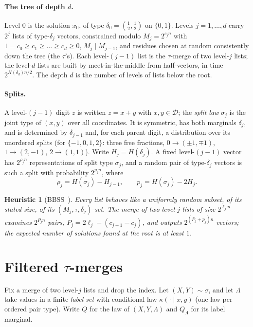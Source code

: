 \documentclass[11pt]{article}
\newtheorem{heuristic}{Heuristic}
\theoremstyle{definition}
\theoremstyle{remark}
\newcommand{\cD}{\mathcal{D}}
\begin{document}
\paragraph{The tree of depth $d$.} Level $0$ is the solution $x_0$, of type $\delta_0=(\tfrac12,\tfrac12)$ on $\{0,1\}$.
Levels $j=1,\dots,d$ carry $2^j$ lists of type-$\delta_j$ vectors, constrained modulo $M_j=2^{c_jn}$ with
$1=c_0\ge c_1\ge\dots\ge c_d\ge0$, $M_j\mid M_{j-1}$, and residues chosen at random consistently down the tree (the
$\tau$'s). Each level-$(j-1)$ list is the $\tau$-merge of two level-$j$ lists; the level-$d$ lists are built by
meet-in-the-middle from half-vectors, in time $2^{H(\delta_d)n/2}$. The depth $d$ is the number of
levels of lists below the root.

\paragraph{Splits.} A level-$(j-1)$ digit $z$ is written $z=x+y$ with $x,y\in\cD$; the \emph{split law} $\sigma_j$ is
the joint type of $(x,y)$ over all coordinates. It is symmetric, has both marginals $\delta_j$, and is determined by
$\delta_{j-1}$ and, for each parent digit, a distribution over its unordered splits (for $\{-1,0,1,2\}$: three free
fractions, $0\to(\pm1,\mp1)$, $1\to(2,-1)$, $2\to(1,1)$). Write $H_j=H(\delta_j)$. A fixed level-$(j-1)$ vector has
$2^{\rho_jn}$ representations of split type $\sigma_j$, and a random pair of type-$\delta_j$ vectors is such a split
with probability $2^{p_jn}$, where
\[
\rho_j=H(\sigma_j)-H_{j-1},\qquad p_j=H(\sigma_j)-2H_j .
\]

\begin{heuristic}[BBSS~\cite{BBSS20}]\label{heur:lists}
Every list behaves like a uniformly random subset, of its stated size, of its $(M_j,\tau,\delta_j)$-set. The merge of
two level-$j$ lists of size $2^{\ell_jn}$ examines $2^{P_jn}$ pairs, $P_j=2\ell_j-(c_{j-1}-c_j)$, and outputs
$2^{(P_j+p_j)n}$ vectors; the expected number of solutions found at the root is at least $1$.
\end{heuristic}

\section{Filtered $\tau$-merges}\label{sec:filter}
Fix a merge of two level-$j$ lists and drop the index. Let $(X,Y)\sim\sigma$, and let $\Lambda$ take values in a
finite \emph{label set} with conditional law $\kappa(\cdot\mid x,y)$ (one law per ordered pair type). Write $Q$ for the
law of $(X,Y,\Lambda)$ and $Q_\Lambda$ for its label marginal.
\end{document}
